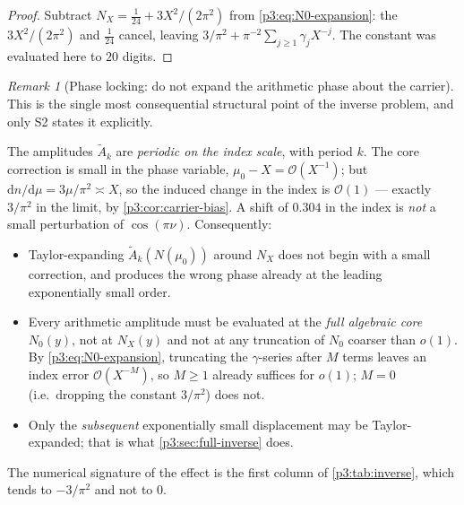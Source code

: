 \documentclass[11pt,a4paper,oneside]{book}
\theoremstyle{plain}
\theoremstyle{definition}
\theoremstyle{remark}
\newtheorem{remark}[theorem]{Remark}
\newcommand{\dd}{\mathrm{d}}
\newcommand{\bigO}{\mathcal{O}}
\newcommand{\littleo}{o}
\begin{document}
\begin{proof}
Subtract $N_{X}=\tfrac1{24}+3X^{2}/(2\pi^{2})$ from \cref{p3:eq:N0-expansion}: the
$3X^{2}/(2\pi^{2})$ and $\tfrac1{24}$ cancel, leaving
$3/\pi^{2}+\pi^{-2}\sum_{j\ge1}\gamma_{j}X^{-j}$. The constant was evaluated here to $20$ digits.
\end{proof}

\begin{remark}[Phase locking: do not expand the arithmetic phase about the
carrier]\label{p3:rem:phase-lock} This is the single most consequential structural point of the
inverse problem, and only S2 states it explicitly.

The amplitudes $\widetilde A_{k}$ are \emph{periodic on the index scale}, with period $k$. The
core correction is small in the phase variable, $\mu_{0}-X=\bigO(X^{-1})$; but $\dd
n/\dd\mu=3\mu/\pi^{2}\asymp X$, so the induced change in the index is $\bigO(1)$ --- exactly
$3/\pi^{2}$ in the limit, by \cref{p3:cor:carrier-bias}. A shift of $0.304$ in the index is
\emph{not} a small perturbation of $\cos(\pi\nu)$. Consequently:
\begin{itemize}
\item Taylor-expanding $\widetilde A_{k}(N(\mu_{0}))$ around $N_{X}$ does not
begin with a small correction, and produces the wrong phase already at the leading exponentially
small order.
\item Every arithmetic amplitude must be evaluated at the \emph{full algebraic
core} $N_{0}(y)$, not at $N_{X}(y)$ and not at any truncation of $N_{0}$ coarser than
$\littleo(1)$. By \cref{p3:eq:N0-expansion}, truncating the $\gamma$-series after $M$ terms
leaves an index error $\bigO(X^{-M})$, so $M\ge1$ already suffices for $\littleo(1)$; $M=0$
(i.e.\ dropping the constant $3/\pi^{2}$) does not.
\item Only the \emph{subsequent} exponentially small displacement may be
Taylor-expanded; that is what \cref{p3:sec:full-inverse} does.
\end{itemize}
The numerical signature of the effect is the first column of \cref{p3:tab:inverse}, which tends to
$-3/\pi^{2}$ and not to $0$.
\end{remark}
\end{document}
